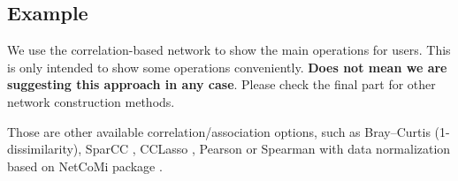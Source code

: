 \documentclass[
]{book}
\newenvironment{Shaded}{\begin{snugshade}}{\end{snugshade}}
\newcommand{\AttributeTok}[1]{\textcolor[rgb]{0.77,0.63,0.00}{#1}}
\newcommand{\CommentTok}[1]{\textcolor[rgb]{0.56,0.35,0.01}{\textit{#1}}}
\newcommand{\FloatTok}[1]{\textcolor[rgb]{0.00,0.00,0.81}{#1}}
\newcommand{\FunctionTok}[1]{\textcolor[rgb]{0.00,0.00,0.00}{#1}}
\newcommand{\NormalTok}[1]{#1}
\newcommand{\OtherTok}[1]{\textcolor[rgb]{0.56,0.35,0.01}{#1}}
\newcommand{\SpecialCharTok}[1]{\textcolor[rgb]{0.00,0.00,0.00}{#1}}
\newcommand{\StringTok}[1]{\textcolor[rgb]{0.31,0.60,0.02}{#1}}
\begin{document}
\hypertarget{example-5}{%
\subsection{Example}\label{example-5}}

We use the correlation-based network to show the main operations for users.
This is only intended to show some operations conveniently.
\textbf{Does not mean we are suggesting this approach in any case}.
Please check the final part for other network construction methods.

\begin{Shaded}
\end{Shaded}

Those are other available correlation/association options,
such as Bray--Curtis (1-dissimilarity), SparCC \citep{Friedman_Inferring_2012}, CCLasso \citep{Fang_CCLasso_2015},
Pearson or Spearman with data normalization based on NetCoMi package \citep{Peschel_NetCoMi_2021}.
\end{document}

